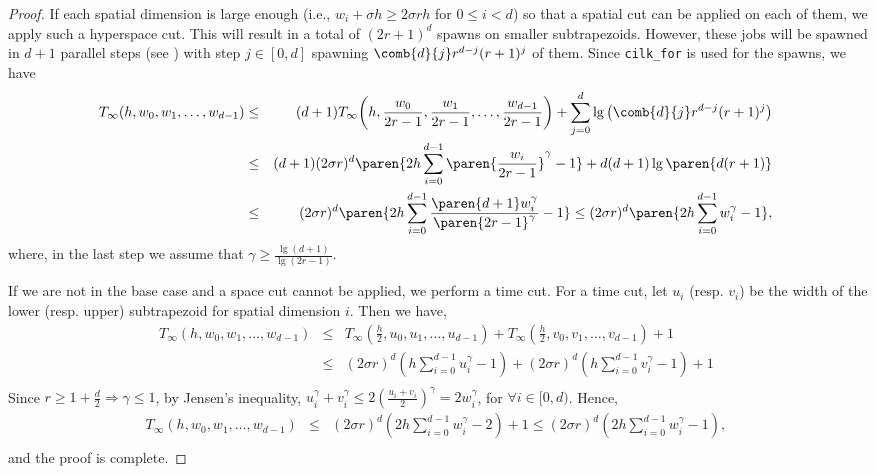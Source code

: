 {\begin{proof}
If each spatial dimension is large enough 
(i.e., $w_i + \sigma h \geq 2 \sigma r h$ for $0 \leq i < d$) 
so that a spatial cut can be applied on each
of them, we apply such a hyperspace cut.
This will result in a total of $(2r + 1)^d$ spawns
on smaller subtrapezoids. However, these jobs
will be spawned in $d + 1$ parallel steps
(see )
with step $j \in [0, d]$ spawning 
$\comb{d}{j} r^{d - j} (r + 1)^j$
of them. Since {\tt cilk\_for} is used for the
spawns, we have
%
\begin{eqnarray*}
T_{\infty}(h, w_0, w_1, \ldots, w_{d - 1})
& \leq & (d + 1) T_{\infty}{\left(h, \frac{w_{0}}{2r - 1}, \frac{w_{1}}{2r - 1}, 
\ldots, \frac{w_{d - 1}}{2r - 1}\right)} + \sum_{j = 0}^{d}{\lg{\left( \comb{d}{j} r^{d - j} (r + 1)^j \right)}}~\\
%
& \leq & (d + 1) (2 \sigma r)^d \paren{  2 h \sum_{i = 0}^{d - 1}{\paren{ \frac{w_i}{2r - 1} }^{\gamma} } - 1 } + d(d + 1)\lg{\paren{ d( r + 1) }}~\\
%
%
& \leq & (2 \sigma r)^d \paren{  2 h \sum_{i = 0}^{d - 1}{ \frac{\paren{ d + 1 } w_i^\gamma }{\paren{ 2r - 1 }^{\gamma}} } - 1 }
  \leq (2 \sigma r)^d \paren{  2 h \sum_{i = 0}^{d - 1}{w_{i}^{\gamma} } - 1 },~\\
\end{eqnarray*}
%
where, in the last step we assume that $\gamma \geq \frac{\lg{(d + 1)}}{\lg{(2r - 1)}}$.

If we are not in the base case and a space cut cannot
be applied, we perform a time cut.
%
For a time cut, let $u_{i}$ (resp. $v_{i}$) be the width of the lower 
(resp. upper) subtrapezoid for spatial dimension $i$. Then we have,
%
\begin{eqnarray*}
T_{\infty}(h, w_0, w_1, \ldots, w_{d - 1})
& \leq & T_{\infty}{\left(\frac{h}{2}, u_0, u_1, \ldots, u_{d - 1}\right)}
+ T_{\infty}{\left(\frac{h}{2}, v_0, v_1, \ldots, v_{d - 1}\right)} + 1~\\
& \leq & {\left( 2 {\sigma} r \right)}^d \left( h {\sum_{i = 0}^{d - 1}{u_{i}^{\gamma}}} - 1 \right)
 + {\left( 2 {\sigma} r \right)}^d \left( h {\sum_{i = 0}^{d - 1}{v_{i}^{\gamma}}} - 1 \right) + 1~\\  
\end{eqnarray*}
%
Since $r \geq 1 + \frac{d}{2} \Rightarrow \gamma \leq 1$, by Jensen's inequality, 
$u_{i}^{\gamma} + v_{i}^{\gamma} \leq 2{\left( \frac{ u_{i} + v_{i} }{2} \right)}^{\gamma} 
= 2w_{i}^{\gamma}$, for $\forall{i} \in [0, d)$.
Hence,
%
\begin{eqnarray*}
T_{\infty}(h, w_0, w_1, \ldots, w_{d - 1})
& \leq & {\left( 2 {\sigma} r \right)}^d \left( 2h {\sum_{i = 0}^{d - 1}{w_{i}^{\gamma}}} - 2 \right) + 1  
 \leq  {\left( 2 {\sigma} r \right)}^d \left( 2h {\sum_{i = 0}^{d - 1}{w_{i}^{\gamma}}} - 1 \right),~\\
\end{eqnarray*}
%
and the proof is complete.

\end{proof}
}


